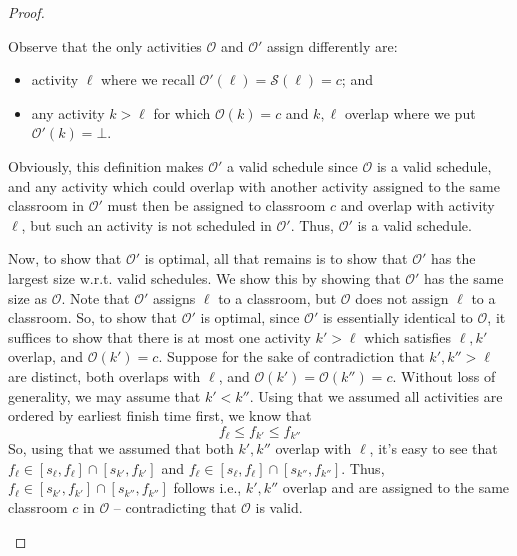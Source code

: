 \documentclass{article}
\theoremstyle{plain}%
\theoremstyle{definition}
\theoremstyle{remark}
\begin{document}
\begin{proof}
\begin{itemize}
            Observe that the only activities $\mathcal{O}$ and $\mathcal{O}'$
                assign differently are:
            \begin{itemize}
                \item activity $\ell$ where we recall $\mathcal{O}'(\ell) = \mathcal{S}(\ell) =c$; and
                \item any activity $k > \ell$ for which $\mathcal{O}(k) =c$ and
                    $k,\ell$ overlap where we put $\mathcal{O}'(k) = \bot$.
            \end{itemize}

            Obviously, this definition makes $\mathcal{O}'$ a valid schedule
                since $\mathcal{O}$ is a valid schedule, and any activity which
                could overlap with another activity assigned to the same
                classroom in $\mathcal{O}'$ must then be assigned to classroom
                $c$ and overlap with activity $\ell$, but such an activity is
                not scheduled in $\mathcal{O}'$.
            Thus, $\mathcal{O}'$ is a valid schedule.

            Now, to show that $\mathcal{O}'$ is optimal, all that remains is to
                show that $\mathcal{O}'$ has the largest size w.r.t. valid schedules.
            We show this by showing that $\mathcal{O}'$ has the same size as
                $\mathcal{O}$.
            Note that $\mathcal{O}'$ assigns $\ell$ to a classroom, but
                $\mathcal{O}$ does not assign $\ell$ to a classroom.
            So, to show that $\mathcal{O}'$ is optimal, since 
                $\mathcal{O}'$ is essentially identical to $\mathcal{O}$,
                it suffices to show that there is at most one activity $k' > \ell$
                which satisfies $\ell,k'$ overlap, and $\mathcal{O}(k') = c$.
            Suppose for the sake of contradiction that $k',k'' > \ell$ are distinct,
                both overlaps with $\ell$, and $\mathcal{O}(k') = \mathcal{O}(k'') = c$.
            Without loss of generality, we may assume that $k' < k''$.
            Using that we assumed all activities are ordered by earliest finish time first, we know that
            \begin{equation}
                f_{\ell} \le f_{k'} \le f_{k''}
            \end{equation}
            So, using that we assumed that both $k',k''$ overlap with $\ell$, 
                it's easy to see that
                $ f_\ell \in [s_\ell, f_\ell] \cap [s_{k'}, f_{k'}]$
                and
                $f_\ell \in [s_\ell, f_\ell] \cap [s_{k''}, f_{k''}]$.
            Thus, $f_\ell \in [s_{k'}, f_{k'}] \cap [s_{k''}, f_{k''}]$ follows i.e.,
                $k',k''$ overlap and are assigned to the same classroom
                $c$ in $\mathcal{O}$ -- contradicting that $\mathcal{O}$ is valid.


\end{itemize}
\end{proof}
\end{document}
